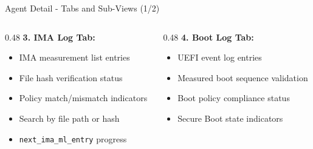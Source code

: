 \begin{frame}{Agent Detail - Tabs and Sub-Views (1/2)}
  \begin{columns}[T]
    \begin{column}{0.48\textwidth}
      \textbf{3. IMA Log Tab:}
      \begin{itemize}
        \item IMA measurement list entries
        \item File hash verification status
        \item Policy match/mismatch indicators
        \item Search by file path or hash
        \item \texttt{next\_ima\_ml\_entry} progress
      \end{itemize}
    \end{column}
    \begin{column}{0.48\textwidth}
      \textbf{4. Boot Log Tab:}
      \begin{itemize}
        \item UEFI event log entries
        \item Measured boot sequence validation
        \item Boot policy compliance status
        \item Secure Boot state indicators
      \end{itemize}
    \end{column}
  \end{columns}
\end{frame}

